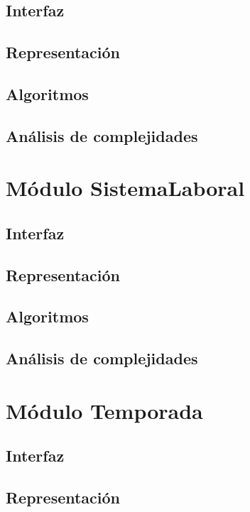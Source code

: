 \documentclass[10pt, a4paper]{article}
\begin{document}
\subsection{Interfaz}

\subsection{Representaci\'on}

\subsection{Algoritmos}

\subsection{Análisis de complejidades}

\newpage

\section{Módulo SistemaLaboral} 
\subsection{Interfaz}

\subsection{Representaci\'on}

\subsection{Algoritmos}

\subsection{Análisis de complejidades}

\newpage

\section{Módulo Temporada} 
\subsection{Interfaz}

\subsection{Representaci\'on}

\end{document}
